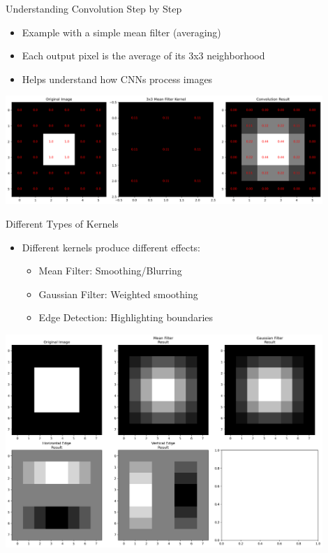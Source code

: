 \documentclass{beamer}
\begin{document}
\begin{frame}{Understanding Convolution Step by Step}
  \begin{itemize}
    \item Example with a simple mean filter (averaging)
    \item Each output pixel is the average of its 3x3 neighborhood
    \item Helps understand how CNNs process images
  \end{itemize}
  \begin{center}
    \includegraphics[width=0.9\textwidth]{images/convolution_basic.png}
  \end{center}
\end{frame}

\begin{frame}{Different Types of Kernels}
  \begin{itemize}
    \item Different kernels produce different effects:
      \begin{itemize}
        \item Mean Filter: Smoothing/Blurring
        \item Gaussian Filter: Weighted smoothing
        \item Edge Detection: Highlighting boundaries
      \end{itemize}
  \end{itemize}
  \begin{center}
    \includegraphics[width=0.9\textwidth]{images/different_kernels.png}
  \end{center}
\end{frame}
\end{document}
